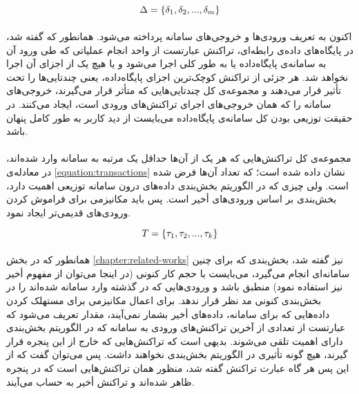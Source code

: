 \begin{latin}
	\begin{equation} \label{equation:tuples}
		\Delta = \left \{ \delta_{1}, \delta_{2}, ..., \delta_{m} \right \}
	\end{equation}
\end{latin}

\paragraph*{}
اکنون به تعریف ورودی‌ها و خروجی‌های سامانه پرداخته می‌شود. همانطور که گفته شد، در پایگاه‌های داده‌ی رابطه‌ای، تراکنش عبارتست از واحد انجام عملیاتی که طی ورود آن به سامانه‌ی پایگاه‌داده یا به طور کلی اجرا می‌شود و یا هیچ یک از اجزای آن اجرا نخواهد شد. هر جزئی از تراکنش کوچک‌ترین اجزای پایگاه‌داده، یعنی چندتایی‌ها را تحت تأثیر قرار می‌دهند و مجموعه‌ی کل چند‌تایی‌هایی که متأثر قرار می‌گیرند، خروجی‌های سامانه را که همان خروجی‌های اجرای تراکنش‌های ورودی است، ایجاد می‌کنند. در حقیقت توزیعی بودن کل سامانه‌ی پایگاه‌داده می‌بایست از دید کاربر به طور کامل پنهان باشد.

\paragraph*{}
مجموعه‌ی کل تراکنش‌هایی که هر یک از آن‌ها حداقل یک مرتبه به سامانه وارد شده‌اند، در معادله‌ی
\ref{equation:transactions}
نشان داده شده است؛ که تعداد آن‌ها
\lr{$ \numberOfTransactions $}
فرض شده است. ولی چیزی که در الگوریتم بخش‌بندی داده‌های درون سامانه توزیعی اهمیت دارد، بخش‌بندی بر اساس ورودی‌های أخیر
است. پس باید مکانیزمی برای فراموش کردن ورودی‌های قدیمی‌تر ایجاد نمود.
\begin{latin}
	\begin{equation} \label{equation:transactions}
		T = \left \{ \tau_{1}, \tau_{2}, ...,\tau_{k} \right \}
	\end{equation}
\end{latin}


\paragraph*{}
همانطور که در بخش
\ref{chapter:related-works}
نیز گفته شد، بخش‌بندی که برای چنین سامانه‌ای انجام می‌گیرد، می‌بایست با حجم کار کنونی (در اینجا می‌توان از مفهوم أخیر نیز استفاده نمود) منطبق باشد و ورودی‌هایی که در گذشته وارد سامانه شده‌اند را در بخش‌بندی کنونی مد نظر قرار ندهد. برای اعمال مکانیزمی برای مستهلک کردن داده‌هایی که برای سامانه، داده‌های أخیر بشمار نمی‌آیند، مقدار
\lr{$ \window $}
تعریف می‌شود که عبارتست از تعدادی از آخرین تراکنش‌های ورودی به سامانه که در الگوریتم بخش‌بندی دارای اهمیت تلقی می‌شوند. بدیهی است که تراکنش‌هایی که خارج از این پنجره قرار گیرند، هیچ گونه تأثیری در الگوریتم بخش‌بندی نخواهند داشت. پس می‌توان گفت که از این پس هر گاه عبارت تراکنش گفته شد، منظور همان تراکنش‌هایی است که در پنجره ظاهر شده‌اند و تراکنش أخیر به حساب می‌آیند.

